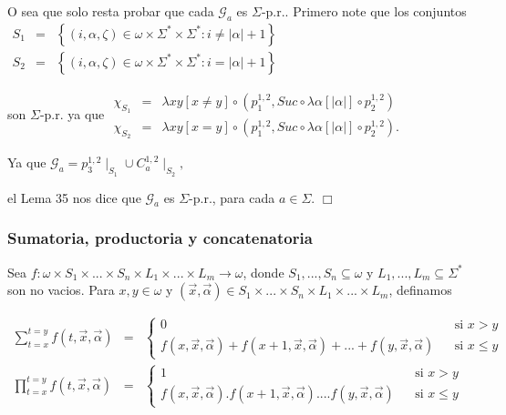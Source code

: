 O sea que solo resta probar que cada \(\mathcal{G}_{a}\) es \(\Sigma \)-p.r.. Primero note que los conjuntos
\(\displaystyle \begin{array}{rcl} S_{1} & =& \left\{ (i,\alpha ,\zeta )\in \omega \times \Sigma ^{\ast }\times \Sigma ^{\ast }:i\neq \left\vert \alpha \right\vert +1\right\} \\ S_{2} & =& \left\{ (i,\alpha ,\zeta )\in \omega \times \Sigma ^{\ast }\times \Sigma ^{\ast }:i=\left\vert \alpha \right\vert +1\right\} \end{array} \)

son \(\Sigma \)-p.r. ya que
\(\displaystyle \begin{array}{rcl} \chi _{S_{1}} & =& \lambda xy\left[ x\neq y\right] \circ \left( p_{1}^{1,2},Suc\circ \lambda \alpha \left[ \left\vert \alpha \right\vert \right] \circ p_{2}^{1,2}\right) \\ \chi _{S_{2}} & =& \lambda xy\left[ x=y\right] \circ \left( p_{1}^{1,2},Suc\circ \lambda \alpha \left[ \left\vert \alpha \right\vert \right] \circ p_{2}^{1,2}\right) . \end{array} \)

Ya que
\(\displaystyle \mathcal{G}_{a}=p_{3}^{1,2}\mid _{S_{1}}\cup C_{a}^{1,2}\mid _{S_{2}}, \)

el Lema 35 nos dice que \(\mathcal{G}_{a}\) es \(\Sigma \)-p.r., para cada \(a\in \Sigma \). \(\Box\)


\subsubsection{Sumatoria, productoria y concatenatoria}

Sea \(f:\omega \times S_{1}\times ...\times S_{n}\times L_{1}\times ...\times L_{m}\rightarrow \omega \), donde \(S_{1},...,S_{n}\subseteq \omega \) y \( L_{1},...,L_{m}\subseteq \Sigma ^{\ast }\) son no vacios. Para \(x,y\in \omega \) y \((\vec{x},\vec{\alpha})\in S_{1}\times ...\times S_{n}\times L_{1}\times ...\times L_{m}\), definamos

\(\displaystyle \begin{array}{rcl} \sum\limits_{t=x}^{t=y}f(t,\vec{x},\vec{\alpha}) & =& \left\{ \begin{array}{lll} 0 & & \text{si }x >y \\ f(x,\vec{x},\vec{\alpha})+f(x+1,\vec{x},\vec{\alpha})+...+f(y,\vec{x},\vec{ \alpha}) & & \text{si }x\leq y \end{array} \right. \\ \prod\limits_{t=x}^{t=y}f(t,\vec{x},\vec{\alpha}) & =& \left\{ \begin{array}{lll} 1 & & \text{si }x >y \\ f(x,\vec{x},\vec{\alpha}).f(x+1,\vec{x},\vec{\alpha})....f(y,\vec{x},\vec{ \alpha}) & & \text{si }x\leq y \end{array} \right. \end{array} \)

